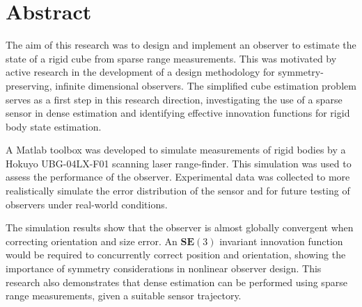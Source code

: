 \chapter*{Abstract}

The aim of this research was to design and implement an observer to estimate the state of a rigid cube from sparse range measurements. This was motivated by active research in the development of a design methodology for symmetry-preserving, infinite dimensional observers. The simplified cube estimation problem serves as a first step in this research direction, investigating the use of a sparse sensor in dense estimation and identifying effective innovation functions for rigid body state estimation. 

A Matlab toolbox was developed to simulate measurements of rigid bodies by a Hokuyo UBG-04LX-F01 scanning laser range-finder. This simulation was used to assess the performance of the observer. Experimental data was collected to more realistically simulate the error distribution of the sensor and for future testing of observers under real-world conditions. 

The simulation results show that the observer is almost globally convergent when correcting orientation and size error. An $\mathbf{SE}(3)$ invariant innovation function would be required to concurrently correct position and orientation, showing the importance of symmetry considerations in nonlinear observer design. This research also demonstrates that dense estimation can be performed using sparse range measurements, given a suitable sensor trajectory. 


